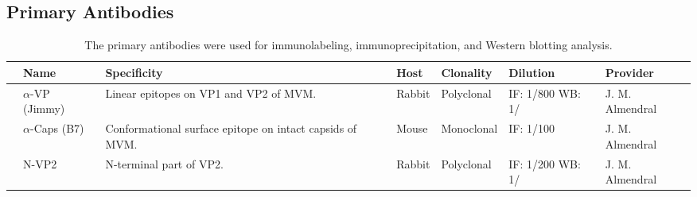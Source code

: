 \subsection{Primary Antibodies}
\bigskip
\begin{small}
\begin{center}
\begin{table}[H]

\caption[Primary Antibodies]{\normalsize The primary antibodies were used for immunolabeling, immunoprecipitation, and Western blotting analysis.}
\vspace{.5cm}
\begin{tabular}{ P{-0.2 cm} P{2 cm} p{4.5cm} l l P{2.3 cm} p{3 cm}}
\hline
\label{Primary antibodies}
\textbf{} & \textbf{Name} & \textbf{Specificity} & \textbf{Host} & \textbf{Clonality} & \textbf{Dilution} & \textbf{Provider}\Tstrut\Bstrut\\
\hline
& $\alpha$-VP (Jimmy) & Linear epitopes on VP1 and VP2 of MVM. & Rabbit & Polyclonal & IF: 1/800 WB: 1/  & J. M. Almendral \cite{pmid15367635}\\ [0.3 cm] 

& $\alpha$-Caps \newline(B7) & Conformational surface epitope on intact capsids of MVM. & Mouse & Monoclonal & IF: 1/100 & J. M. Almendral \cite{pmid12552010} \\ [0.3 cm] 

& N-VP2 & N-terminal part of VP2. & Rabbit & Polyclonal & IF: 1/200 WB: 1/ & J. M. Almendral \cite{pmid15367635}\\[.8ex]
\hline
\end{tabular}

\end{table}
\end{center}
\end{small}


